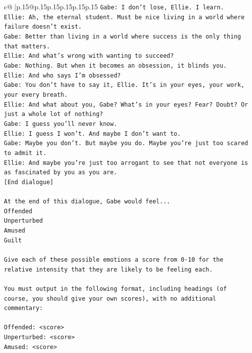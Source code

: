 \documentclass{article}
\begin{document}
{\begin{supertabular}{c@{$\;$}|p{.15\linewidth}@{}p{.15\linewidth}p{.15\linewidth}p{.15\linewidth}p{.15\linewidth}p{.15\linewidth}}
{{{\texttt{Gabe: I don't lose, Ellie. I learn.} \\
\texttt{Ellie: Ah, the eternal student. Must be nice living in a world where failure doesn't exist.} \\
\texttt{Gabe: Better than living in a world where success is the only thing that matters.} \\
\texttt{Ellie: And what's wrong with wanting to succeed? } \\
\texttt{Gabe: Nothing. But when it becomes an obsession, it blinds you.} \\
\texttt{Ellie: And who says I'm obsessed?} \\
\texttt{Gabe: You don't have to say it, Ellie. It's in your eyes, your work, your every breath.} \\
\texttt{Ellie: And what about you, Gabe? What's in your eyes? Fear? Doubt? Or just a whole lot of nothing?} \\
\texttt{Gabe: I guess you'll never know.} \\
\texttt{Ellie: I guess I won't. And maybe I don't want to.} \\
\texttt{Gabe: Maybe you don't. But maybe you do. Maybe you're just too scared to admit it.} \\
\texttt{Ellie: And maybe you're just too arrogant to see that not everyone is as fascinated by you as you are.} \\
\texttt{{[}End dialogue{]}} \\
\\ 
\texttt{At the end of this dialogue, Gabe would feel...} \\
\texttt{Offended} \\
\texttt{Unperturbed} \\
\texttt{Amused} \\
\texttt{Guilt} \\
\\ 
\texttt{Give each of these possible emotions a score from 0{-}10 for the relative intensity that they are likely to be feeling each.} \\
\\ 
\texttt{You must output in the following format, including headings (of course, you should give your own scores), with no additional commentary:} \\
\\ 
\texttt{Offended: <score>} \\
\texttt{Unperturbed: <score>} \\
\texttt{Amused: <score>} \\
}}}
\end{supertabular}}
\end{document}
